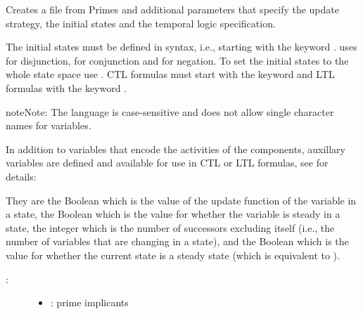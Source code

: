 \documentclass[letterpaper,10pt,english]{sphinxmanual}
\begin{document}
\begin{fulllineitems}
\label{\detokenize{ModelChecking:PyBoolNet.ModelChecking.primes2smv}}
Creates a  file from Primes and additional parameters that specify the update strategy, the initial states and the temporal logic specification.

The initial states must be defined in {\hyperref[\detokenize{Installation:installation-nusmv}]{}} syntax, i.e.,
starting with the keyword .
{\hyperref[\detokenize{Installation:installation-nusmv}]{}} uses \sphinxstyleemphasis{\textbar{}} for disjunction, \sphinxstyleemphasis{\&} for conjunction and \sphinxstyleemphasis{!} for negation.
To set the initial states to the whole state space use .
CTL formulas must start with the keyword  and LTL formulas with the keyword .

\begin{sphinxadmonition}{note}{Note:}
The {\hyperref[\detokenize{Installation:installation-nusmv}]{}} language is case-sensitive and does not allow single character names for variables.
\end{sphinxadmonition}

In addition to variables that encode the activities of the components,
auxillary variables are defined and available for use in CTL or LTL formulas,
see {\hyperref[\detokenize{Manual:sec-model-checking}]{}} for details:

They are the Boolean  which is the value of the update function of the variable  in a state,
the Boolean  which is the value for whether the variable  is steady in a state,
the integer  which is the number of successors excluding itself (i.e., the number of variables that are changing in a state), and
the Boolean  which is the value for whether the current state is a steady state (which is equivalent to ).
\begin{description}
\item[{:}] \leavevmode\begin{itemize}
\item {} 
: prime implicants


\end{itemize}
\end{description}
\end{fulllineitems}
\end{document}
